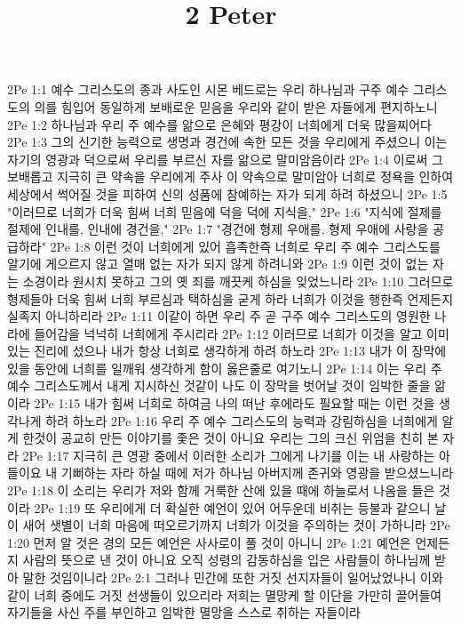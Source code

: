 

\title{2 Peter}

2Pe 1:1  예수 그리스도의 종과 사도인 시몬 베드로는 우리 하나님과 구주 예수 그리스도의 의를 힘입어 동일하게 보배로운 믿음을 우리와 같이 받은 자들에게 편지하노니
2Pe 1:2  하나님과 우리 주 예수를 앎으로 은혜와 평강이 너희에게 더욱 많을찌어다
2Pe 1:3  그의 신기한 능력으로 생명과 경건에 속한 모든 것을 우리에게 주셨으니 이는 자기의 영광과 덕으로써 우리를 부르신 자를 앎으로 말미암음이라
2Pe 1:4  이로써 그 보배롭고 지극히 큰 약속을 우리에게 주사 이 약속으로 말미암아 너희로 정욕을 인하여 세상에서 썩어질 것을 피하여 신의 성품에 참예하는 자가 되게 하려 하셨으니
2Pe 1:5  "이러므로 너희가 더욱 힘써 너희 믿음에 덕을 덕에 지식을,"
2Pe 1:6  "지식에 절제를 절제에 인내를, 인내에 경건을,"
2Pe 1:7  "경건에 형제 우애를, 형제 우애에 사랑을 공급하라"
2Pe 1:8  이런 것이 너희에게 있어 흡족한즉 너희로 우리 주 예수 그리스도를 알기에 게으르지 않고 열매 없는 자가 되지 않게 하려니와
2Pe 1:9  이런 것이 없는 자는 소경이라 원시치 못하고 그의 옛 죄를 깨끗케 하심을 잊었느니라
2Pe 1:10  그러므로 형제들아 더욱 힘써 너희 부르심과 택하심을 굳게 하라 너희가 이것을 행한즉 언제든지 실족지 아니하리라
2Pe 1:11  이같이 하면 우리 주 곧 구주 예수 그리스도의 영원한 나라에 들어감을 넉넉히 너희에게 주시리라
2Pe 1:12  이러므로 너희가 이것을 알고 이미 있는 진리에 섰으나 내가 항상 너희로 생각하게 하려 하노라
2Pe 1:13  내가 이 장막에 있을 동안에 너희를 일깨워 생각하게 함이 옳은줄로 여기노니
2Pe 1:14  이는 우리 주 예수 그리스도께서 내게 지시하신 것같이 나도 이 장막을 벗어날 것이 임박한 줄을 앎이라
2Pe 1:15  내가 힘써 너희로 하여금 나의 떠난 후에라도 필요할 때는 이런 것을 생각나게 하려 하노라
2Pe 1:16  우리 주 예수 그리스도의 능력과 강림하심을 너희에게 알게 한것이 공교히 만든 이야기를 좇은 것이 아니요 우리는 그의 크신 위엄을 친히 본 자라
2Pe 1:17  지극히 큰 영광 중에서 이러한 소리가 그에게 나기를 이는 내 사랑하는 아들이요 내 기뻐하는 자라 하실 때에 저가 하나님 아버지께 존귀와 영광을 받으셨느니라
2Pe 1:18  이 소리는 우리가 저와 함께 거룩한 산에 있을 때에 하늘로서 나옴을 들은 것이라
2Pe 1:19  또 우리에게 더 확실한 예언이 있어 어두운데 비취는 등불과 같으니 날이 새어 샛별이 너희 마음에 떠오르기까지 너희가 이것을 주의하는 것이 가하니라
2Pe 1:20  먼저 알 것은 경의 모든 예언은 사사로이 풀 것이 아니니
2Pe 1:21  예언은 언제든지 사람의 뜻으로 낸 것이 아니요 오직 성령의 감동하심을 입은 사람들이 하나님께 받아 말한 것임이니라
2Pe 2:1  그러나 민간에 또한 거짓 선지자들이 일어났었나니 이와 같이 너희 중에도 거짓 선생들이 있으리라 저희는 멸망케 할 이단을 가만히 끌어들여 자기들을 사신 주를 부인하고 임박한 멸망을 스스로 취하는 자들이라
